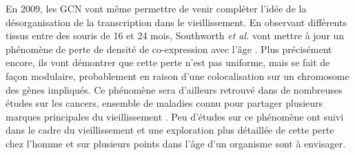 En 2009, les \acrshort{GCN} vont même permettre de venir compléter l'idée de la désorganisation de la transcription dans le vieillissement. En observant différents tissus entre des souris de 16 et 24 mois, Southworth \textit{et al.} vont mettre à jour un phénomène de perte de densité de co-expression avec l'âge \cite{Southworth2009}. Plus précisément encore, ils vont démontrer que cette perte n'est pas uniforme, mais se fait de façon modulaire, probablement en raison d'une colocalisation sur un chromosome des gènes impliqués. Ce phénomène sera d'ailleurs retrouvé dans de nombreuses études sur les cancers, ensemble de maladies connu pour partager plusieurs marques principales du vieillissement \cite{Anglani2014}. Peu d'études sur ce phénomène ont suivi dans le cadre du vieillissement et une exploration plus détaillée de cette perte chez l'homme et sur plusieurs points dans l'âge d'un \gls{organisme} sont à envisager.











